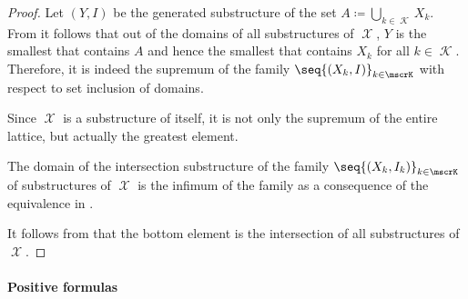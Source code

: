 \begin{proof}
   Let \( (Y, I) \) be the generated substructure of the set \( A \coloneqq \bigcup_{k \in \mscrK} X_k \). From  it follows that out of the domains of all substructures of \( \mscrX \), \( Y \) is the smallest that contains \( A \) and hence the smallest that contains \( X_k \) for all \( k \in \mscrK \). Therefore, it is indeed the supremum of the family \( \seq{ (X_k, I) }_{k \in \mscrK} \) with respect to set inclusion of domains.

   Since \( \mscrX \) is a substructure of itself, it is not only the supremum of the entire lattice, but actually the greatest element.

   The domain of the intersection substructure of the family \( \seq{ (X_k, I_k) }_{k \in \mscrK} \) of substructures of \( \mscrX \) is the infimum of the family as a consequence of the equivalence in .

   It follows from  that the bottom element is the intersection of all substructures of \( \mscrX \).
\end{proof}

\paragraph{Positive formulas}

